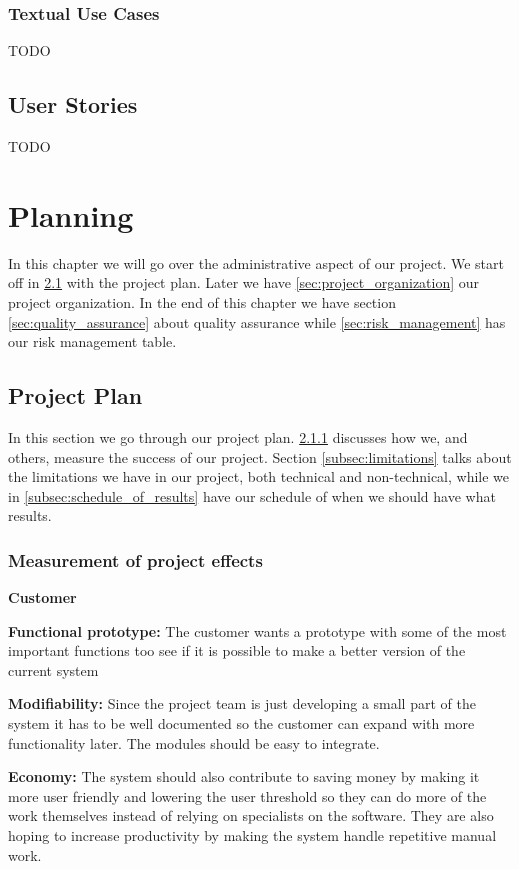 \documentclass{report}
\begin{document}
\subsection{Textual Use Cases} \label{subsec:textual_use_cases}
TODO
\section{User Stories} \label{sec:user_stories}
TODO



\chapter{Planning} \label{cha:planning}
In this chapter we will go over the administrative aspect of our project. We start off in \ref{sec:project_plan} with the project plan. Later we have \ref{sec:project_organization} our project organization. In the end of this chapter we have section \ref{sec:quality_assurance} about quality assurance while \ref{sec:risk_management} has our risk management table.

\section{Project Plan} \label{sec:project_plan}
In this section we  go through our project plan. \ref{subsec:measurement_of_project_effects} discusses how we, and others, measure the success of our project. Section \ref{subsec:limitations} talks about the limitations we have in our project, both technical and non-technical, while we in \ref{subsec:schedule_of_results} have our schedule of when we should have what results.
\subsection{Measurement of project effects} \label{subsec:measurement_of_project_effects}
\textbf{Customer}

\textbf{Functional prototype:} The customer wants a prototype with some of the most important functions too see if it is possible to make a better version of the current system

\textbf{Modifiability:} Since the project team is just developing a small part of the system it has to be well documented so the customer can expand with more functionality later. The modules should be easy to integrate.

\textbf{Economy:} The system should also contribute to saving money by making it more user friendly and lowering the user threshold so they can do more of the work themselves instead of relying on specialists on the software. They are also hoping to increase productivity by making the system handle repetitive manual work. 
\end{document}
